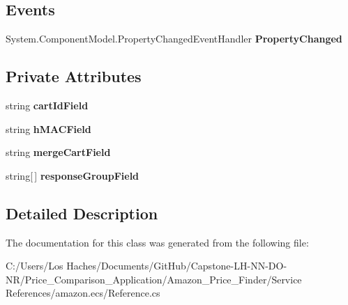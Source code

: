 \subsection*{Events}
\begin{DoxyCompactItemize}
\item 
\hypertarget{class_price___comparison_1_1amazon_1_1ecs_1_1_cart_get_request_a82f3e09a8dc53d13f8f56b75852e3a09}{System.\-Component\-Model.\-Property\-Changed\-Event\-Handler {\bfseries Property\-Changed}}\label{class_price___comparison_1_1amazon_1_1ecs_1_1_cart_get_request_a82f3e09a8dc53d13f8f56b75852e3a09}

\end{DoxyCompactItemize}
\subsection*{Private Attributes}
\begin{DoxyCompactItemize}
\item 
\hypertarget{class_price___comparison_1_1amazon_1_1ecs_1_1_cart_get_request_a63ed922c77b2b93ab1ed16c4a0456ea0}{string {\bfseries cart\-Id\-Field}}\label{class_price___comparison_1_1amazon_1_1ecs_1_1_cart_get_request_a63ed922c77b2b93ab1ed16c4a0456ea0}

\item 
\hypertarget{class_price___comparison_1_1amazon_1_1ecs_1_1_cart_get_request_a9dc3603d7dcdcb0427943532228ece98}{string {\bfseries h\-M\-A\-C\-Field}}\label{class_price___comparison_1_1amazon_1_1ecs_1_1_cart_get_request_a9dc3603d7dcdcb0427943532228ece98}

\item 
\hypertarget{class_price___comparison_1_1amazon_1_1ecs_1_1_cart_get_request_a59c10a3fdf4a7e0c07c9643c50874d6c}{string {\bfseries merge\-Cart\-Field}}\label{class_price___comparison_1_1amazon_1_1ecs_1_1_cart_get_request_a59c10a3fdf4a7e0c07c9643c50874d6c}

\item 
\hypertarget{class_price___comparison_1_1amazon_1_1ecs_1_1_cart_get_request_aa003df7dde7c7eebec559517ebce3cac}{string\mbox{[}$\,$\mbox{]} {\bfseries response\-Group\-Field}}\label{class_price___comparison_1_1amazon_1_1ecs_1_1_cart_get_request_aa003df7dde7c7eebec559517ebce3cac}

\end{DoxyCompactItemize}


\subsection{Detailed Description}


The documentation for this class was generated from the following file\-:\begin{DoxyCompactItemize}
\item 
C\-:/\-Users/\-Los Haches/\-Documents/\-Git\-Hub/\-Capstone-\/\-L\-H-\/\-N\-N-\/\-D\-O-\/\-N\-R/\-Price\-\_\-\-Comparison\-\_\-\-Application/\-Amazon\-\_\-\-Price\-\_\-\-Finder/\-Service References/amazon.\-ecs/Reference.\-cs\end{DoxyCompactItemize}
